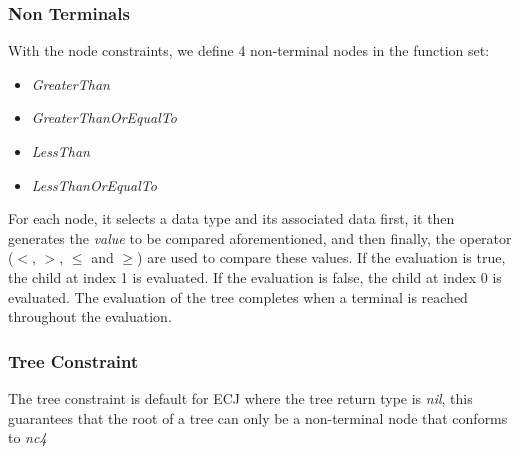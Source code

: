 \subsubsection{Non Terminals}
With the node constraints, we define 4 non-terminal nodes in the function set:
\begin{itemize}
	\item \emph{GreaterThan}
	\item \emph{GreaterThanOrEqualTo}
	\item \emph{LessThan}
	\item \emph{LessThanOrEqualTo}
\end{itemize} 
For each node, it selects a data type and its associated data first, it then generates the \emph{value} to be compared aforementioned, and then finally, the operator ($<$, $>$, $\leq$ and $\geq$) are used to compare these values. If the evaluation is true, the child at index 1 is evaluated. If the evaluation is false, the child at index 0 is evaluated. The evaluation of the tree completes when a terminal is reached throughout the evaluation.

\subsubsection{Tree Constraint}
The tree constraint is default for ECJ where the tree return type is \emph{nil}, this guarantees that the root of a tree can only be a non-terminal node that conforms to \emph{nc4}


